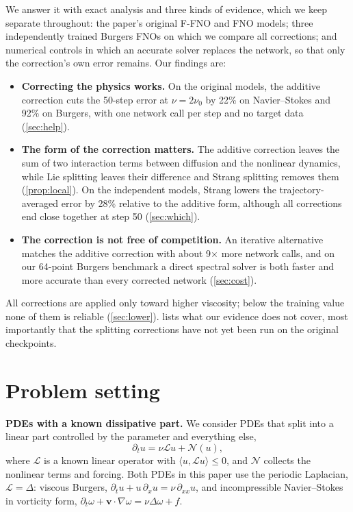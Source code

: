 \documentclass{article}
\theoremstyle{plain}
\newcommand{\add}{additive correction\xspace}
\newcommand{\N}{\mathcal{N}}
\newcommand{\Lop}{\mathcal{L}}
\begin{document}
We answer it with exact analysis and three kinds of evidence, which we keep separate throughout: the paper's original F-FNO and FNO models; three independently trained Burgers FNOs on which we compare all corrections; and numerical controls in which an accurate solver replaces the network, so that only the correction's own error remains.
Our findings are:
\begin{itemize}
  \setlength\itemsep{1pt}
  \item \textbf{Correcting the physics works.} On the original models, the \add cuts the 50-step error at $\nu=2\nu_0$ by 22\% on Navier--Stokes and 92\% on Burgers, with one network call per step and no target data (\cref{sec:help}).
  \item \textbf{The form of the correction matters.} The \add leaves the sum of two interaction terms between diffusion and the nonlinear dynamics, while Lie splitting leaves their difference and Strang splitting removes them (\cref{prop:local}). On the independent models, Strang lowers the trajectory-averaged error by 28\% relative to the additive form, although all corrections end close together at step 50 (\cref{sec:which}).
  \item \textbf{The correction is not free of competition.} An iterative alternative matches the \add with about 9$\times$ more network calls, and on our 64-point Burgers benchmark a direct spectral solver is both faster and more accurate than every corrected network (\cref{sec:cost}).
\end{itemize}
All corrections are applied only toward higher viscosity; below the training value none of them is reliable (\cref{sec:lower}).
 lists what our evidence does not cover, most importantly that the splitting corrections have not yet been run on the original checkpoints.

\section{Problem setting}
\label{sec:setting}

\textbf{PDEs with a known dissipative part.}
We consider PDEs that split into a linear part controlled by the parameter and everything else,
\begin{equation}
  \partial_t u = \nu \Lop u + \N(u),
  \label{eq:pde}
\end{equation}
where $\Lop$ is a known linear operator with $\langle u,\Lop u\rangle\le0$, and $\N$ collects the nonlinear terms and forcing.
Both PDEs in this paper use the periodic Laplacian, $\Lop=\Delta$: viscous Burgers, $\partial_t u + u\,\partial_x u = \nu\,\partial_{xx}u$, and incompressible Navier--Stokes in vorticity form, $\partial_t\omega + \bm v\cdot\nabla\omega = \nu\Delta\omega + f$.
\end{document}
